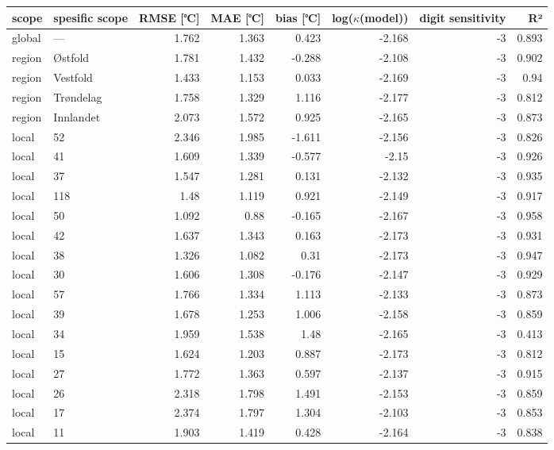\begin{tabular}{llrrrrrr}
\hline
 scope   & spesific
scope           &       RMSE
[℃] &   MAE [℃] &        bias
[℃] &   log($\kappa$(model)) &    digit
sensitivity &    R² \\
\hline
 global  & ---       & 1.762 &     1.363 &  0.423 &                 -2.168 & -3 & 0.893 \\
 region  & Østfold   & 1.781 &     1.432 & -0.288 &                 -2.108 & -3 & 0.902 \\
 region  & Vestfold  & 1.433 &     1.153 &  0.033 &                 -2.169 & -3 & 0.94  \\
 region  & Trøndelag & 1.758 &     1.329 &  1.116 &                 -2.177 & -3 & 0.812 \\
 region  & Innlandet & 2.073 &     1.572 &  0.925 &                 -2.165 & -3 & 0.873 \\
 local   & 52        & 2.346 &     1.985 & -1.611 &                 -2.156 & -3 & 0.826 \\
 local   & 41        & 1.609 &     1.339 & -0.577 &                 -2.15  & -3 & 0.926 \\
 local   & 37        & 1.547 &     1.281 &  0.131 &                 -2.132 & -3 & 0.935 \\
 local   & 118       & 1.48  &     1.119 &  0.921 &                 -2.149 & -3 & 0.917 \\
 local   & 50        & 1.092 &     0.88  & -0.165 &                 -2.167 & -3 & 0.958 \\
 local   & 42        & 1.637 &     1.343 &  0.163 &                 -2.173 & -3 & 0.931 \\
 local   & 38        & 1.326 &     1.082 &  0.31  &                 -2.173 & -3 & 0.947 \\
 local   & 30        & 1.606 &     1.308 & -0.176 &                 -2.147 & -3 & 0.929 \\
 local   & 57        & 1.766 &     1.334 &  1.113 &                 -2.133 & -3 & 0.873 \\
 local   & 39        & 1.678 &     1.253 &  1.006 &                 -2.158 & -3 & 0.859 \\
 local   & 34        & 1.959 &     1.538 &  1.48  &                 -2.165 & -3 & 0.413 \\
 local   & 15        & 1.624 &     1.203 &  0.887 &                 -2.173 & -3 & 0.812 \\
 local   & 27        & 1.772 &     1.363 &  0.597 &                 -2.137 & -3 & 0.915 \\
 local   & 26        & 2.318 &     1.798 &  1.491 &                 -2.153 & -3 & 0.859 \\
 local   & 17        & 2.374 &     1.797 &  1.304 &                 -2.103 & -3 & 0.853 \\
 local   & 11        & 1.903 &     1.419 &  0.428 &                 -2.164 & -3 & 0.838 \\
\hline
\end{tabular}